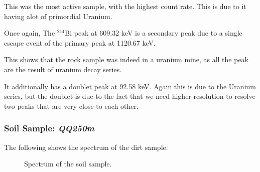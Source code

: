 \documentclass{article}
\begin{document}
This was the most active sample, with the highest count rate. This is due to it having alot of primordial Uranium.

Once again, The $^{214}$Bi peak at 609.32 keV is a secondary peak due to a single escape event of the primary peak at 1120.67 keV.

This shows that the rock sample was indeed in a uranium mine, as all the peak are the result of uranium decay series.

It additionally has a doublet peak at 92.58 keV. Again this is due to the Uranium series, but the doublet is due to the fact that we need higher resolution to resolve two peaks that are very close to each other.

\pagebreak{}

\subsubsection{Soil Sample: \textit{QQ250m}}

The following shows the spectrum of the dirt sample:

\begin{figure}[h!]
	\centering
	\scalebox{1}{}
	\caption{Spectrum of the soil sample.}
	\label{fig:Dirt}
\end{figure}
\end{document}
